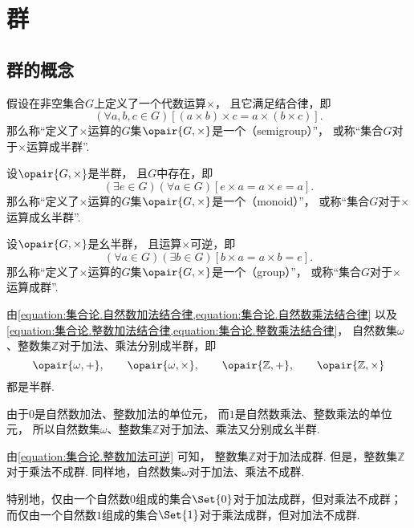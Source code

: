 \section{群}
\subsection{群的概念}
\begin{definition}
假设在非空集合\(G\)上定义了一个代数运算\(\times\)，
且它满足结合律，即\[
	(\forall a,b,c \in G)
	[(a \times b) \times c = a \times (b \times c)].
\]
那么称“定义了\(\times\)运算的\(G\)集\(\opair{G,\times}\)是一个（semigroup）”，
或称“集合\(G\)对于\(\times\)运算成半群”.
\end{definition}

\begin{definition}
设\(\opair{G,\times}\)是半群，
且\(G\)中存在，即\[
	(\exists e \in G)(\forall a \in G)
	[e \times a = a \times e = a].
\]
那么称“定义了\(\times\)运算的\(G\)集\(\opair{G,\times}\)是一个（monoid）”，
或称“集合\(G\)对于\(\times\)运算成幺半群”.
\end{definition}

\begin{definition}
设\(\opair{G,\times}\)是幺半群，
且运算\(\times\)可逆，即\[
	(\forall a \in G)(\exists b \in G)
	[b \times a = a \times b = e].
\]
那么称“定义了\(\times\)运算的\(G\)集\(\opair{G,\times}\)是一个（group）”，
或称“集合\(G\)对于\(\times\)运算成群”.
\end{definition}

由\cref{equation:集合论.自然数加法结合律,equation:集合论.自然数乘法结合律}
以及\cref{equation:集合论.整数加法结合律,equation:集合论.整数乘法结合律}，
自然数集\(\omega\)、整数集\(\mathbb{Z}\)对于加法、乘法分别成半群，即\[
	\opair{\omega,+}, \qquad
	\opair{\omega,\times}, \qquad
	\opair{\mathbb{Z},+}, \qquad
	\opair{\mathbb{Z},\times}
\]都是半群.

由于\(0\)是自然数加法、整数加法的单位元，
而\(1\)是自然数乘法、整数乘法的单位元，
所以自然数集\(\omega\)、整数集\(\mathbb{Z}\)对于加法、乘法又分别成幺半群.

由\cref{equation:集合论.整数加法可逆} 可知，
整数集\(\mathbb{Z}\)对于加法成群.
但是，整数集\(\mathbb{Z}\)对于乘法不成群.
同样地，自然数集\(\omega\)对于加法、乘法不成群.

特别地，仅由一个自然数\(0\)组成的集合\(\Set{0}\)对于加法成群，但对乘法不成群；
而仅由一个自然数\(1\)组成的集合\(\Set{1}\)对于乘法成群，但对加法不成群.

